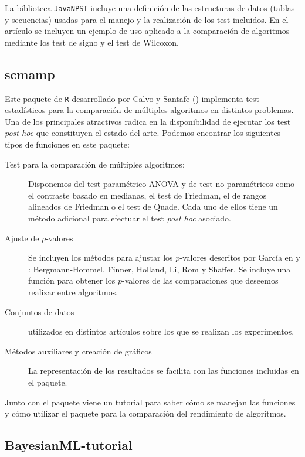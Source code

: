 	La biblioteca \texttt{JavaNPST} incluye una definición de 
las estructuras de datos (tablas y secuencias) usadas para 
el manejo y la realización de los test incluidos. En el 
artículo se incluyen un ejemplo de uso aplicado a la 
comparación de algoritmos mediante los test de 
signo y el test de Wilcoxon. 

\subsection*{scmamp} 

	Este paquete de \texttt{R} desarrollado por Calvo y 
Santafe (\cite{scmamp}) implementa test estadísticos para
la comparación de múltiples algoritmos en distintos 
problemas. Una de los principales atractivos radica en la 
disponibilidad de ejecutar los test \textit{post hoc} que
constituyen el estado del arte. Podemos encontrar los 
siguientes tipos de funciones en este paquete:

\begin{description}
	\item[Test para la comparación de múltiples algoritmos:]
		Disponemos del test paramétrico ANOVA y de test
		no paramétricos como el contraste basado en
		medianas, el test de Friedman, el de rangos alineados
		de Friedman o el test de Quade. Cada uno de ellos
		tiene un método adicional para efectuar el test
		 \textit{post hoc} asociado.
	\item[Ajuste de $p$-valores] Se incluyen los métodos
		para ajustar los $p$-valores descritos por García en
		\cite{garcia2008extension} y 
		\cite{DBLP:journals/isci/GarciaFLH10}:
		Bergmann-Hommel, Finner, Holland, Li, Rom y Shaffer.
		Se incluye una función para obtener los $p$-valores
		de las comparaciones que deseemos realizar entre
		algoritmos.
	\item[Conjuntos de datos] utilizados en distintos
		artículos sobre los que se realizan los experimentos. 
	\item[Métodos auxiliares y creación de gráficos] La
		representación de los resultados se facilita 
		con las funciones incluidas en el paquete.
\end{description}

	Junto con el paquete viene un tutorial para saber cómo
se manejan las funciones y cómo utilizar el paquete para
la comparación del rendimiento de algoritmos.

\subsection*{BayesianML-tutorial}

